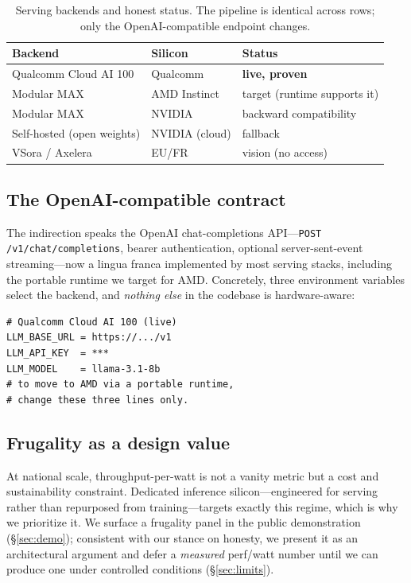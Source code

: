 \begin{table}[t]
\centering
\caption{Serving backends and honest status. The pipeline is identical across
rows; only the OpenAI-compatible endpoint changes.}
\label{tab:backends}
\small
\begin{tabular}{@{}lll@{}}
\toprule
Backend & Silicon & Status \\
\midrule
Qualcomm Cloud AI 100 & Qualcomm & \textbf{live, proven} \\
Modular MAX & AMD Instinct & target (runtime supports it) \\
Modular MAX & NVIDIA & backward compatibility \\
Self-hosted (open weights) & NVIDIA (cloud) & fallback \\
VSora / Axelera & EU/FR & vision (no access) \\
\bottomrule
\end{tabular}
\end{table}

\subsection{The OpenAI-compatible contract}
The indirection speaks the OpenAI chat-completions API---\texttt{POST
/v1/chat/completions}, bearer authentication, optional server-sent-event
streaming---now a lingua franca implemented by most serving stacks, including
the portable runtime we target for AMD. Concretely, three environment variables
select the backend, and \emph{nothing else} in the codebase is hardware-aware:

\begin{lstlisting}[style=lr]
# Qualcomm Cloud AI 100 (live)
LLM_BASE_URL = https://.../v1
LLM_API_KEY  = ***
LLM_MODEL    = llama-3.1-8b
# to move to AMD via a portable runtime,
# change these three lines only.
\end{lstlisting}

\subsection{Frugality as a design value}
At national scale, throughput-per-watt is not a vanity metric but a cost and
sustainability constraint. Dedicated inference silicon---engineered for serving
rather than repurposed from training---targets exactly this regime, which is
why we prioritize it. We surface a frugality panel in the public demonstration
(\S\ref{sec:demo}); consistent with our stance on honesty, we present it as an
architectural argument and defer a \emph{measured} perf/watt number until we
can produce one under controlled conditions (\S\ref{sec:limits}).
